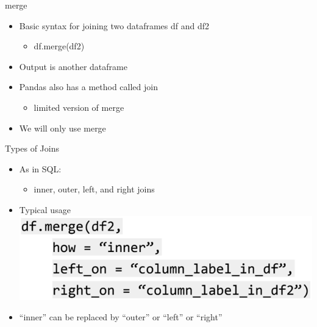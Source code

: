 \documentclass[aspectratio=169]{../latex_main/tntbeamer}  %
\begin{document}
    
    \begin{frame}{merge}
        \begin{itemize}
            \item Basic syntax for joining two dataframes df and df2
            \begin{itemize}
                \item df.merge(df2)
            \end{itemize}
            \item Output is another dataframe
            \item Pandas also has a method called join
            \begin{itemize}
                \item limited version of merge
            \end{itemize}
            \item We will only use merge
        \end{itemize}
    \end{frame}
    
    
    
    \begin{frame}{Types of Joins}
        \begin{itemize}
            \item As in SQL:
            \begin{itemize}
                \item inner, outer, left, and right joins
            \end{itemize}
            \item Typical usage\\
            \includegraphics[scale=.35]{Bild41}
            \item “inner” can be replaced by “outer” or “left” or “right”
        \end{itemize}
    \end{frame}
    
    
    
\end{document}
